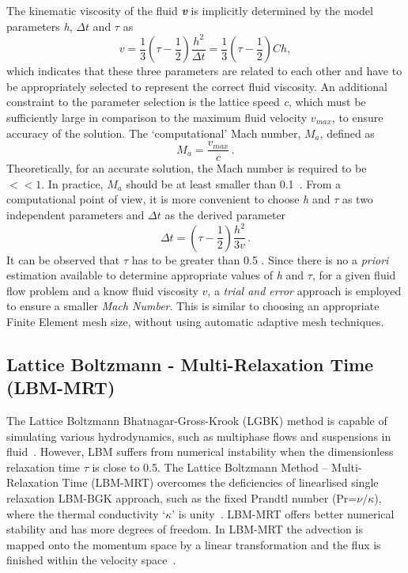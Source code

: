 The kinematic viscosity of the fluid \textbf{\textit{v}} is implicitly 
determined by the model parameters \textit{h}, $\Delta \mathit{t}$ and $\tau$ 
as
%
\begin{equation}
	\mathit{v}=\frac{1}{3}(\tau - \frac{1}{2})\frac{\mathit{h}^{2}}{\Delta 
	\mathit{t}} = \frac{1}{3}(\tau - \frac{1}{2})\mathit{Ch},
\end{equation}
%
\noindent which indicates that these three parameters are related to each other 
and have to be appropriately selected to represent the correct fluid viscosity. 
An additional constraint to the parameter selection is the lattice speed 
\textit{c}, which must be sufficiently large in comparison to the maximum 
fluid velocity $\mathit{v}_{\mathit{max}}$, to ensure 
accuracy of the solution. The `computational' Mach number, 
$\mathit{M}_{\mathit{a}}$, defined as
%
\begin{equation}
	\mathit{M}_{\mathit{a}}=\frac{\mathit{v}_{\mathit{max}}}{\mathit{c}}\,.
\end{equation}
%
Theoretically, for an accurate solution, the Mach number is required to be $<< 
1$. In practice, $\mathit{M}_{\mathit{a}}$ should be at least smaller than 
0.1~\citep{He1997}. 
From a computational point of view, it is more convenient to choose \textit{h} 
and $\tau$ as two independent parameters and $\Delta \mathit{t}$ as the derived 
parameter
%
\begin{equation}
	\Delta \mathit{t} = (\tau - \frac{1}{2}) \frac{h^{2}}{3\mathit{v}}\,.
\end{equation}
%
It can be observed that $\tau$ has to be greater than 0.5 \citep{He1997}. 
Since there is no a \emph{priori} estimation available to determine appropriate 
values 
of \textit{h} and $\tau$, for a given fluid flow problem and a know fluid 
viscosity $\mathit{v}$, a \textit{trial and error} approach is employed to 
ensure a smaller \textit{Mach Number}. This is similar to choosing an 
appropriate Finite Element mesh size, without using automatic adaptive mesh 
techniques. 

\subsection{Lattice Boltzmann - Multi-Relaxation Time (LBM-MRT)}

The Lattice Boltzmann Bhatnagar-Gross-Krook (LGBK) method is capable of 
simulating various hydrodynamics, such as multiphase flows and 
suspensions in fluid~\citep{Succi1989,Succi2001}. However, LBM suffers from 
numerical instability when the dimensionless relaxation time $\tau$ is close to 
0.5. The Lattice Boltzmann Method -- Multi-Relaxation Time (LBM-MRT) overcomes 
the deficiencies of linearlised single relaxation LBM-BGK approach, such as the 
fixed Prandtl number (Pr=$\nu/\kappa$), where the thermal conductivity 
`$\kappa$' is unity~\citep{Liu2003a}. LBM-MRT offers better numerical stability 
and has more degrees of freedom. In LBM-MRT the advection is mapped onto the 
momentum space by a linear transformation and the flux is finished within the 
velocity space~\citep{Du2006}.

